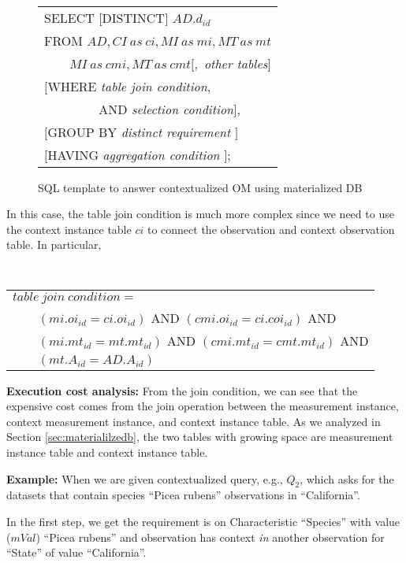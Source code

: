 \begin{figure}[htb]
{\tt
\begin{tabular}{l}
SELECT $[$DISTINCT$]$ $AD.d_{id}$\\
FROM $AD, CI~as~ci,MI~as~mi, MT~as~mt$\\
$\qquad MI~as~cmi, MT~as~cmt[,$ {\em other tables}$]$\\
$[$WHERE    {\em table join condition}, \\
$\qquad\qquad$ AND {\em selection condition}$]$,\\
$[$GROUP BY {\em distinct requirement} $]$\\
$[$HAVING   {\em aggregation condition} $]$;
\end{tabular}
}
\caption{SQL template to answer contextualized OM using materialized DB}
\label{fig:sql_matdb_context_omq}
\end{figure}

In this case, the table join condition is much more complex since we
need to use the context instance table $ci$ to connect the
observation and context observation table.
In particular,

\vspace{0.1in}
{\tt
\begin{tabular}{l}
$table~join~condition=$\\
$\qquad (mi.oi_{id}=ci.oi_{id})$ AND $(cmi.oi_{id}=ci.coi_{id})$ AND\\
$\qquad (mi.mt_{id}=mt.mt_{id})$ AND $(cmi.mt_{id}=cmt.mt_{id})$ AND\\
$\qquad (mt.A_{id}=AD.A_{id})$
\end{tabular}
}
\vspace{0.1in}

{\bf Execution cost analysis:} From the join condition, we can see that the expensive cost comes from
the join operation between the measurement instance, context
measurement instance, and context instance table.
As we analyzed in Section \ref{sec:materialilzedb}, the two tables with
growing space are measurement instance table and context instance
table.

{\bf Example:} When we are given contextualized query, e.g., $Q_2$, which asks for
the datasets that contain species ``Picea rubens'' observations in
``California''.

In the first step, we get the requirement is on Characteristic
``Species'' with value ($mVal$) ``Picea rubens'' and observation has context {\em in}
another observation for ``State'' of value ``California''.


